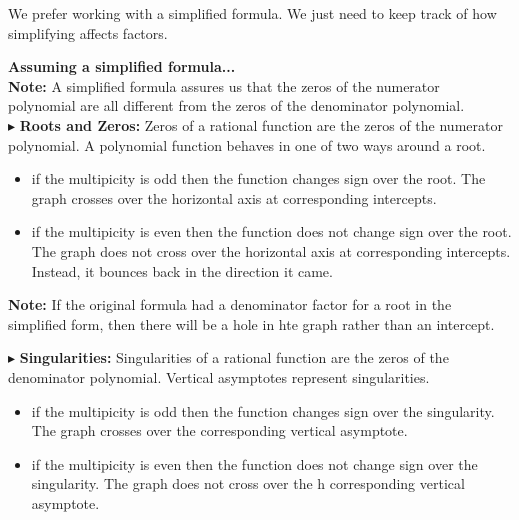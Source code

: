 \documentclass{ximera}
\begin{document}
We prefer working with a simplified formula.  We just need to keep track of how simplifying affects factors.


\textbf{\textcolor{red!25!blue!75!}{Assuming a simplified formula...}} \\




\textbf{Note:} A simplified formula assures us that the zeros of the numerator polynomial are all different from the zeros of the denominator polynomial. \\









$\blacktriangleright$ \textbf{Roots and Zeros:}   Zeros of a rational function are the zeros of the numerator polynomial.  A polynomial function behaves in one of two ways around a root.

\begin{itemize}
\item if the multipicity is odd then the function changes sign over the root.  The graph crosses over the horizontal axis at corresponding intercepts.
\item if the multipicity is even then the function does not change sign over the root.  The graph does not cross over the horizontal axis at corresponding intercepts. Instead, it bounces back in the direction it came.
\end{itemize}


\textbf{Note:} If the original formula had a denominator factor for a root in the simplified form, then there will be a hole in hte graph rather than an intercept. 



$\blacktriangleright$ \textbf{Singularities:}   Singularities of a rational function are the zeros of the denominator polynomial.  Vertical asymptotes represent singularities.

\begin{itemize}
\item if the multipicity is odd then the function changes sign over the singularity.  The graph crosses over the corresponding vertical asymptote.
\item if the multipicity is even then the function does not change sign over the singularity.  The graph does not cross over the h corresponding vertical asymptote. 
\end{itemize}
\end{document}
